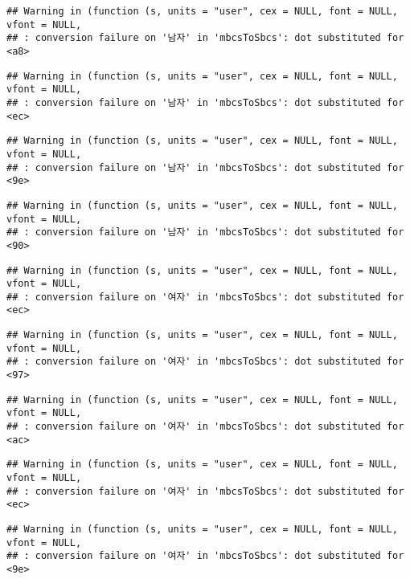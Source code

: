 \documentclass[
]{article}
\begin{document}
\begin{verbatim}
## Warning in (function (s, units = "user", cex = NULL, font = NULL, vfont = NULL,
## : conversion failure on '남자' in 'mbcsToSbcs': dot substituted for <a8>
\end{verbatim}

\begin{verbatim}
## Warning in (function (s, units = "user", cex = NULL, font = NULL, vfont = NULL,
## : conversion failure on '남자' in 'mbcsToSbcs': dot substituted for <ec>
\end{verbatim}

\begin{verbatim}
## Warning in (function (s, units = "user", cex = NULL, font = NULL, vfont = NULL,
## : conversion failure on '남자' in 'mbcsToSbcs': dot substituted for <9e>
\end{verbatim}

\begin{verbatim}
## Warning in (function (s, units = "user", cex = NULL, font = NULL, vfont = NULL,
## : conversion failure on '남자' in 'mbcsToSbcs': dot substituted for <90>
\end{verbatim}

\begin{verbatim}
## Warning in (function (s, units = "user", cex = NULL, font = NULL, vfont = NULL,
## : conversion failure on '여자' in 'mbcsToSbcs': dot substituted for <ec>
\end{verbatim}

\begin{verbatim}
## Warning in (function (s, units = "user", cex = NULL, font = NULL, vfont = NULL,
## : conversion failure on '여자' in 'mbcsToSbcs': dot substituted for <97>
\end{verbatim}

\begin{verbatim}
## Warning in (function (s, units = "user", cex = NULL, font = NULL, vfont = NULL,
## : conversion failure on '여자' in 'mbcsToSbcs': dot substituted for <ac>
\end{verbatim}

\begin{verbatim}
## Warning in (function (s, units = "user", cex = NULL, font = NULL, vfont = NULL,
## : conversion failure on '여자' in 'mbcsToSbcs': dot substituted for <ec>
\end{verbatim}

\begin{verbatim}
## Warning in (function (s, units = "user", cex = NULL, font = NULL, vfont = NULL,
## : conversion failure on '여자' in 'mbcsToSbcs': dot substituted for <9e>
\end{verbatim}
\end{document}
